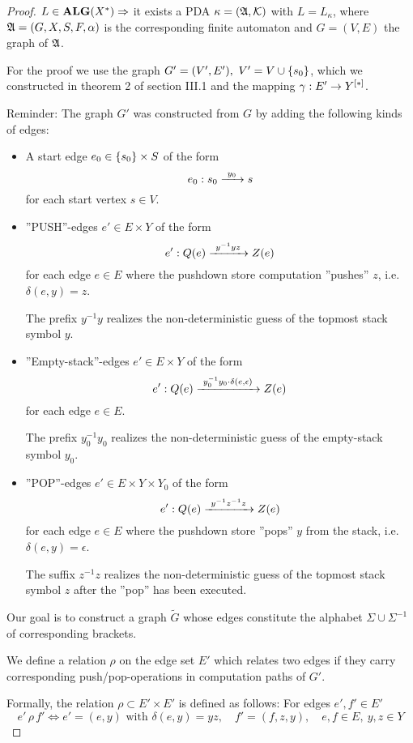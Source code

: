 \begin{proof}
$L\in \mbox{{\bf ALG}}(X^*) \Rightarrow$ it exists a PDA $\kappa=(\mbox{$\mathfrak{A}$},\mbox{$\mathcal{K}$})$ with
$L = L_\kappa$, where $\mbox{$\mathfrak{A}$}=(G, X, S, F, \alpha)$ is the corresponding finite
automaton and $G=(V, E)$ the graph of $\mbox{$\mathfrak{A}$}$.

For the proof we use the graph $G'=(V',E'),\ V' = V \cup \mbox{$\{s_0\}$}$, which we
constructed in theorem 2 of section III.1 and the mapping $\gamma: E' \to 
\mbox{${Y}^{[*]}$}$.

Reminder: The graph $G'$ was constructed from $G$ by adding the following kinds
of edges:
\begin{itemize}
  \item A start edge $e_0 \in \mbox{$\{s_0\}$} \times S$ of the form 
  \[e_0: s_0 \xrightarrow{\ {y_0}\ } s\] 
  for each start vertex $s \in V$.
  
  \item ''PUSH''-edges $e' \in E \times Y$ of the form
  \[e': Q(e) \xrightarrow{\ {y^{-1} y z}\ } Z(e)\]
  for each edge $e \in E$ where the pushdown store computation ''pushes'' $z$,
  i.e.\ $\delta(e, y) = z$. 
  
  The prefix $y^{-1} y$ realizes the non-deterministic guess of the topmost
  stack symbol $y$.
  
  \item ''Empty-stack''-edges $e' \in E \times Y$ of the form
  \[e': Q(e) \xrightarrow{\ {y_0^{-1} y_0 \cdot \delta(e, \epsilon)}\ } Z(e)\]
  for each edge $e \in E$.
  
  The prefix $y_0^{-1} y_0$ realizes the non-deterministic guess of the
  empty-stack symbol $y_0$.
  
  \item ''POP''-edges $e' \in E \times Y \times Y_0$ of the form
  \[e': Q(e) \xrightarrow{\ {y^{-1} z^{-1} z}\ } Z(e)\]
  for each edge $e \in E$ where the pushdown store ''pops'' $y$ from the stack,
  i.e.\ $\delta(e, y) = \epsilon$.
  
  The suffix $z^{-1} z$ realizes the non-deterministic guess of the topmost
  stack symbol $z$ after the ''pop'' has been executed.
\end{itemize}

Our goal is to construct a graph $\tilde{G}$ whose edges constitute the alphabet
$\Sigma \cup \Sigma^{-1}$ of corresponding brackets.

We define a relation $\rho$ on the edge set $E'$ which relates two edges if they
carry corresponding push/pop-operations in computation paths of $G'$.

Formally, the relation $\rho \subset E' \times E'$ is defined as follows: For
edges $e', f' \in E'$
\[ e' \,\rho\, f' \iff e' = (e, y)\text{ with }\delta(e, y) = y z,\quad f' = (f,
z, y),\quad e, f \in E,\ y,z \in Y \]


\end{proof}
